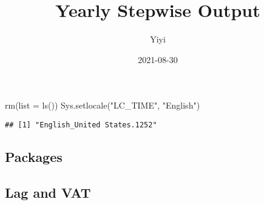 \documentclass[
]{article}
\title{Yearly Stepwise Output}
\author{Yiyi}
\date{2021-08-30}
\newenvironment{Shaded}{\begin{snugshade}}{\end{snugshade}}
\newcommand{\AttributeTok}[1]{\textcolor[rgb]{0.77,0.63,0.00}{#1}}
\newcommand{\FunctionTok}[1]{\textcolor[rgb]{0.00,0.00,0.00}{#1}}
\newcommand{\NormalTok}[1]{#1}
\newcommand{\StringTok}[1]{\textcolor[rgb]{0.31,0.60,0.02}{#1}}
\begin{document}
\maketitle

{
\setcounter{tocdepth}{3}
\tableofcontents
}
\hypertarget{section}{%
\section{}\label{section}}

\begin{Shaded}
\begin{Highlighting}[]
 \FunctionTok{rm}\NormalTok{(}\AttributeTok{list =} \FunctionTok{ls}\NormalTok{())}
\FunctionTok{Sys.setlocale}\NormalTok{(}\StringTok{"LC\_TIME"}\NormalTok{, }\StringTok{"English"}\NormalTok{)}
\end{Highlighting}
\end{Shaded}

\begin{verbatim}
## [1] "English_United States.1252"
\end{verbatim}

\hypertarget{packages}{%
\subsection{Packages}\label{packages}}

\hypertarget{lag-and-vat}{%
\subsection{Lag and VAT}\label{lag-and-vat}}
\end{document}
